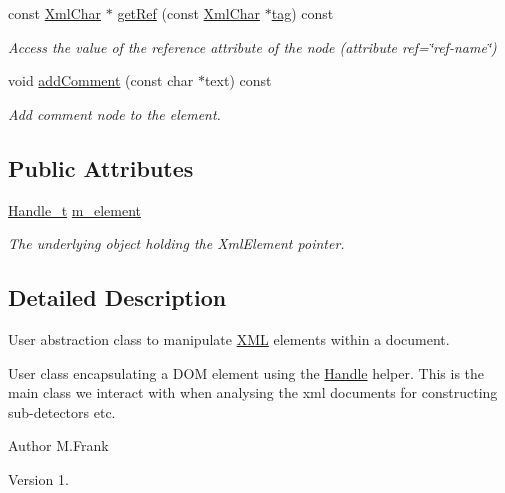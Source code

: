 \begin{DoxyCompactItemize}
const \hyperlink{namespace_d_d4hep_1_1_x_m_l_a09e5d9cc86ed782f6826dfe0778c1815}{Xml\+Char} $\ast$ \hyperlink{class_d_d4hep_1_1_x_m_l_1_1_element_abaf22d4ac5b302e7d3e4a70106d43b2d}{get\+Ref} (const \hyperlink{namespace_d_d4hep_1_1_x_m_l_a09e5d9cc86ed782f6826dfe0778c1815}{Xml\+Char} $\ast$\hyperlink{class_d_d4hep_1_1_x_m_l_1_1_element_ade0bb178aee242e967d48be672c66b1d}{tag}) const
\begin{DoxyCompactList}\small\item\em Access the value of the reference attribute of the node (attribute ref=\char`\"{}ref-\/name\char`\"{}) \end{DoxyCompactList}\item 
void \hyperlink{class_d_d4hep_1_1_x_m_l_1_1_element_ac3dd678d5df495ea9e62b664b4b3fc0b}{add\+Comment} (const char $\ast$text) const
\begin{DoxyCompactList}\small\item\em Add comment node to the element. \end{DoxyCompactList}\end{DoxyCompactItemize}
\subsection*{Public Attributes}
\begin{DoxyCompactItemize}
\item 
\hyperlink{class_d_d4hep_1_1_x_m_l_1_1_handle__t}{Handle\+\_\+t} \hyperlink{class_d_d4hep_1_1_x_m_l_1_1_element_aa79a832ef142a29be556a3ec21c4e36d}{m\+\_\+element}
\begin{DoxyCompactList}\small\item\em The underlying object holding the Xml\+Element pointer. \end{DoxyCompactList}\end{DoxyCompactItemize}


\subsection{Detailed Description}
User abstraction class to manipulate \hyperlink{namespace_d_d4hep_1_1_x_m_l}{X\+ML} elements within a document. 

User class encapsulating a D\+OM element using the \hyperlink{class_d_d4hep_1_1_handle}{Handle} helper. This is the main class we interact with when analysing the xml documents for constructing sub-\/detectors etc.

\begin{DoxyAuthor}{Author}
M.\+Frank 
\end{DoxyAuthor}
\begin{DoxyVersion}{Version}
1. 
\end{DoxyVersion}


